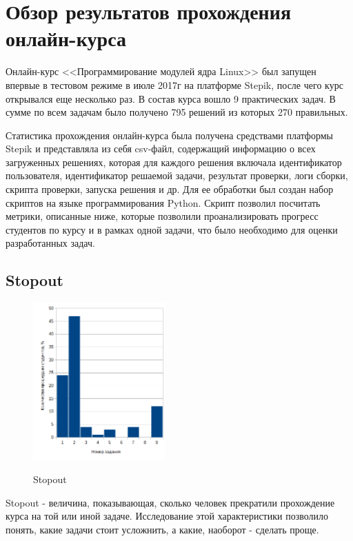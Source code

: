 \documentclass[a4paper,12pt]{article}
\begin{document}
\section{Обзор результатов прохождения онлайн-курса}
Онлайн-курс <<Программирование модулей ядра Linux>> был запущен впервые в тестовом режиме в июле 2017г на платформе Stepik\cite{stepic2}, после чего курс открывался еще несколько раз. В состав курса вошло 9 практических задач. В сумме по всем задачам было получено 795 решений из которых 270 правильных.

Статистика прохождения онлайн-курса была получена средствами платформы Stepik и представляла из себя csv-файл, содержащий информацию о всех загруженных решениях, которая для каждого решения включала идентификатор пользователя, идентификатор решаемой задачи, результат проверки, логи сборки, скрипта проверки, запуска решения и др. Для ее обработки был создан набор скриптов на языке программирования Python\cite{python}. Скрипт позволил посчитать метрики, описанные ниже, которые позволили проанализировать прогресс студентов по курсу и в рамках одной задачи, что было необходимо для оценки разработанных задач.

\subsection{Stopout}

\begin{figure}
	\caption{Stopout}
	\centering
	\includegraphics[width=0.45\textwidth]{stopout.png}
	\label{fig:mesh2}
\end{figure}

Stopout\cite{stopout}\cite{likelytostop} - величина, показывающая, сколько человек прекратили прохождение курса на той или иной задаче. Исследование этой характеристики позволило понять, какие задачи стоит усложнить, а какие, наоборот - сделать проще.
\end{document}

